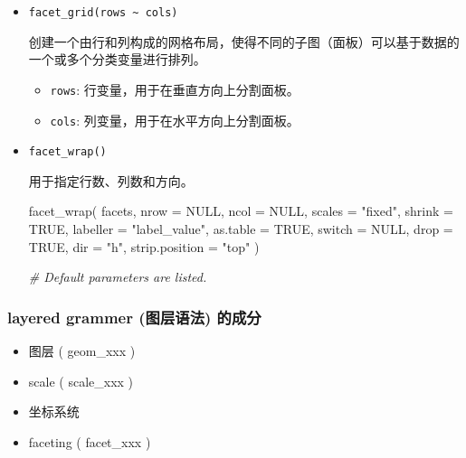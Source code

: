 \documentclass[
]{article}
\newenvironment{Shaded}{}{}
\newcommand{\AttributeTok}[1]{\textcolor[rgb]{0.49,0.56,0.16}{#1}}
\newcommand{\CommentTok}[1]{\textcolor[rgb]{0.38,0.63,0.69}{\textit{#1}}}
\newcommand{\ConstantTok}[1]{\textcolor[rgb]{0.53,0.00,0.00}{#1}}
\newcommand{\FunctionTok}[1]{\textcolor[rgb]{0.02,0.16,0.49}{#1}}
\newcommand{\NormalTok}[1]{#1}
\newcommand{\StringTok}[1]{\textcolor[rgb]{0.25,0.44,0.63}{#1}}
\begin{document}
\begin{itemize}
\item
  \texttt{facet\_grid(rows\ \textasciitilde{}\ cols)}

  创建一个由行和列构成的网格布局，使得不同的子图（面板）可以基于数据的一个或多个分类变量进行排列。

  \begin{itemize}
  \item
    \texttt{rows}: 行变量，用于在垂直方向上分割面板。
  \item
    \texttt{cols}: 列变量，用于在水平方向上分割面板。
  \end{itemize}
\item
  \texttt{facet\_wrap()}

  用于指定行数、列数和方向。

\begin{Shaded}
\begin{Highlighting}[]
\FunctionTok{facet\_wrap}\NormalTok{(}
\NormalTok{  facets,}
  \AttributeTok{nrow =} \ConstantTok{NULL}\NormalTok{,}
  \AttributeTok{ncol =} \ConstantTok{NULL}\NormalTok{,}
  \AttributeTok{scales =} \StringTok{"fixed"}\NormalTok{,}
  \AttributeTok{shrink =} \ConstantTok{TRUE}\NormalTok{,}
  \AttributeTok{labeller =} \StringTok{"label\_value"}\NormalTok{,}
  \AttributeTok{as.table =} \ConstantTok{TRUE}\NormalTok{,}
  \AttributeTok{switch =} \ConstantTok{NULL}\NormalTok{,}
  \AttributeTok{drop =} \ConstantTok{TRUE}\NormalTok{,}
  \AttributeTok{dir =} \StringTok{"h"}\NormalTok{,}
  \AttributeTok{strip.position =} \StringTok{"top"}
\NormalTok{)}

\CommentTok{\# Default parameters are listed.}
\end{Highlighting}
\end{Shaded}
\end{itemize}

\hypertarget{layered-grammer-ux56feux5c42ux8bedux6cd5-ux7684ux6210ux5206}{%
\subsubsection{layered grammer (图层语法)
的成分}\label{layered-grammer-ux56feux5c42ux8bedux6cd5-ux7684ux6210ux5206}}

\begin{itemize}
\item
  图层 ( geom\_xxx )
\item
  scale ( scale\_xxx )
\item
  坐标系统
\item
  faceting ( facet\_xxx )
\end{itemize}
\end{document}

